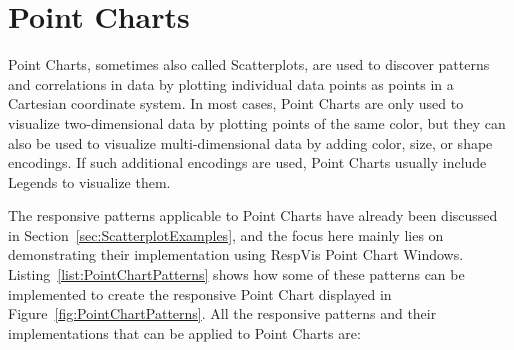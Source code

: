 \section{Point Charts}
\label{sec:PointChartsUsage}

Point Charts, sometimes also called Scatterplots, are used to discover patterns and correlations in data by plotting individual data points as points in a Cartesian coordinate system.
In most cases, Point Charts are only used to visualize two-dimensional data by plotting points of the same color, but they can also be used to visualize multi-dimensional data by adding color, size, or shape encodings.
If such additional encodings are used, Point Charts usually include Legends to visualize them. 

The responsive patterns applicable to Point Charts have already been discussed in Section~\ref{sec:ScatterplotExamples}, and the focus here mainly lies on demonstrating their implementation using RespVis Point Chart Windows.
Listing~\ref{list:PointChartPatterns} shows how some of these patterns can be implemented to create the responsive Point Chart displayed in Figure~\ref{fig:PointChartPatterns}.
All the responsive patterns and their implementations that can be applied to Point Charts are:

